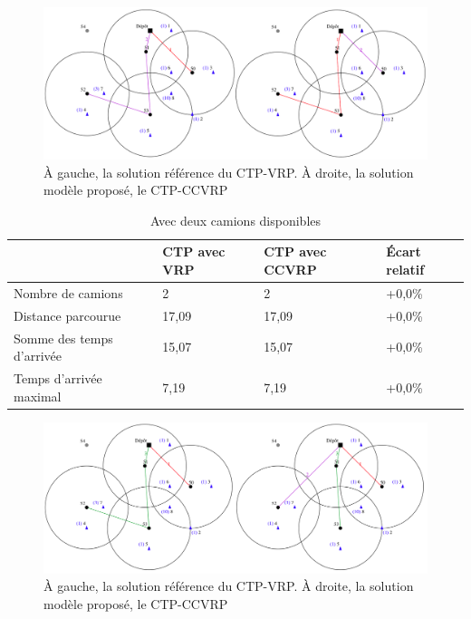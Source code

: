 \documentclass[12pt, a4paper, onecolumn, twoside,french,cleardoublepage=plain,openany]{article}
\begin{document}
\begin{figure}[H] \centering
	\centerline{\includegraphics[width=1.3\textwidth]{figures/deux_camions_combines}}
	\caption[]{À gauche, la solution référence du CTP-VRP. À droite, la solution modèle proposé, le CTP-CCVRP} \label{fig_deux_camions}
\end{figure}

\begin{table}[H] \centering \begin{tabular}{@{}llll@{}} \toprule %
 & CTP avec VRP & CTP avec CCVRP & Écart relatif \\ \midrule
Nombre de camions & 2 & 2 & +0,0\% \\
Distance parcourue & 17,09 & 17,09 & +0,0\% \\
Somme des temps d'arrivée & 15,07 & 15,07 & +0,0\% \\
Temps d'arrivée maximal & 7,19 & 7,19 & +0,0\% \\ \bottomrule
\end{tabular} \caption{Avec deux camions disponibles} \label{deux_camions}
\end{table}


\begin{figure}[H] \centering
	\centerline{\includegraphics[width=1.3\textwidth]{figures/trois_camions_combines}}
	\caption[]{À gauche, la solution référence du CTP-VRP. À droite, la solution modèle proposé, le CTP-CCVRP} \label{fig_trois_camions}
\end{figure}
\end{document}
